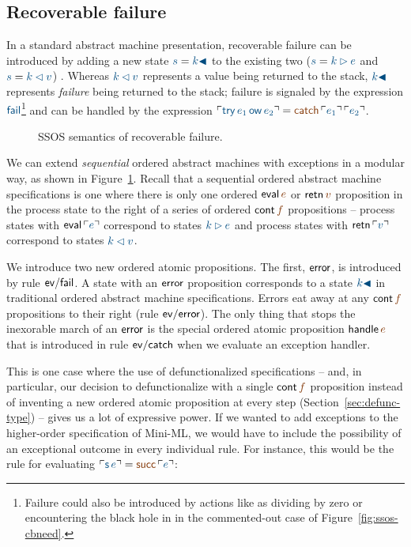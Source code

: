 \subsection{Recoverable failure}
\label{sec:failure}

In a standard abstract machine presentation, recoverable failure can 
be introduced by adding a new state $\obj{s} = \obj{k {\blacktriangleleft}}$
to the existing two ($\obj{s} = \obj{k \rhd e}$ and $\obj{s} = \obj{k \lhd v}$)
\cite[Chapter 28]{harper12practical}. Whereas $\obj{k
\lhd v}$ represents a value being returned to the stack, $\obj{k
{\blacktriangleleft}}$ represents {\it failure} being returned to the
stack; failure is signaled by the expression $\obj{\sf fail}$\footnote{Failure 
could also be introduced by actions like as dividing
by zero or encountering the black hole in in the commented-out case of
Figure~\ref{fig:ssos-cbneed}.} and
can be handled by the expression $\interp{{\sf try}\,e_1\,{\sf ow}\,e_2} = 
\lf{{\sf catch}\,\interp{e_1}\,\interp{e_2}}$. 

\begin{figure}
\caption{SSOS semantics of recoverable failure.}
\label{fig:ssos-fail}
\end{figure}


We can extend {\it sequential} ordered abstract machines with
exceptions in a modular way, as shown in
Figure~\ref{fig:ssos-fail}. Recall that a sequential ordered abstract
machine specifications is one where there is only one ordered ${\sf
  eval}\,\lf{e}$ 
or ${\sf retn}\,\lf{v}$ proposition in the process state to the
right of a series of ordered ${\sf cont}\,\lf{f}$ propositions -- process
states with ${\sf eval}\,\interp{e}$ correspond to states $\obj{k \rhd e}$
and process states with ${\sf retn}\,\interp{v}$ correspond to states
$\obj{k \lhd v}$. 

We introduce two new ordered atomic propositions. The first, ${\sf
  error}$, is introduced by rule ${\sf ev/fail}$.
 A state with an ${\sf error}$
proposition corresponds to a state $\obj{k{\blacktriangleleft}}$ in
traditional ordered abstract machine specifications. Errors eat away
at any ${\sf cont}\,\lf{f}$ propositions to their right (rule ${\sf
  ev/error}$). The only thing that stops the inexorable march of an
${\sf error}$ is the special ordered atomic proposition ${\sf
  handle}\,\lf{e}$ that is introduced in rule ${\sf ev/catch}$ when we
evaluate an exception handler.

This is one case where the use of defunctionalized specifications --
and, in particular, our decision to defunctionalize with a single
${\sf cont}\,\lf{f}$ proposition instead of inventing a new ordered atomic
proposition at every step (Section~\ref{sec:defunc-type}) -- 
gives us a lot of expressive power. If we
wanted to add exceptions to the higher-order specification of Mini-ML,
we would have to include the possibility of an exceptional outcome in
every individual rule. For instance, this would be the 
rule for evaluating $\interp{{\sf s}\,e} = \lf{{\sf succ}\,\interp{e}}$:

